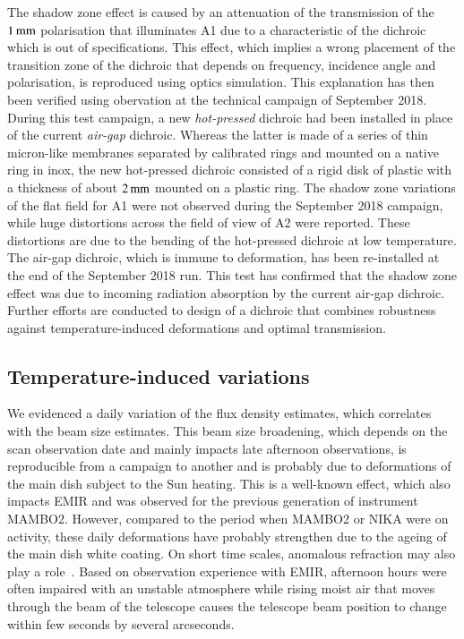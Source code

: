 The shadow zone effect is caused by an attenuation of
the transmission of the $1\,\rm{mm}$ polarisation that illuminates
A1 due to a characteristic of the dichroic which is out of
specifications.
This effect,
which implies a wrong placement of the transition zone of the dichroic
that depends on frequency, incidence angle and polarisation, is 
reproduced using optics simulation. This explanation has then been
verified using obervation at the technical campaign of September
2018. During this test campaign, a new \emph{hot-pressed} dichroic had
been installed in place of the current \emph{air-gap} dichroic.
Whereas the latter is made of a series of thin
micron-like membranes separated by calibrated rings and mounted on
a native ring in inox, the new hot-pressed dichroic consisted of a
rigid disk of plastic with a thickness of about $2\,\rm{mm}$ mounted on a
plastic ring. The shadow zone variations of the flat field for A1 were
not observed during the September 2018 campaign, while huge distortions
across the field of view of A2 were reported. These distortions are
due to the bending of the hot-pressed dichroic at low temperature.
The air-gap dichroic, which is immune to deformation, has been
re-installed at the end of the September 2018 run. This test has
confirmed that the shadow zone effect was due
to incoming radiation absorption by the current air-gap dichroic.
Further efforts are conducted to design of a dichroic that combines
robustness against temperature-induced deformations and optimal
transmission.



\subsection{Temperature-induced variations}
\label{se:beam_variation}
We evidenced a daily variation of the flux density estimates,
which correlates with the beam size estimates.
This beam size broadening, which depends on the
scan observation date and mainly impacts late
afternoon observations, is reproducible from a campaign to another and 
is probably due to deformations of the main dish subject to the Sun
heating. This is a well-known effect, which also impacts EMIR and was
observed for the previous generation of instrument MAMBO2. However,
compared to the period when MAMBO2 or NIKA were on activity, these
daily deformations have probably strengthen due to the ageing of the
main dish white coating. On short time scales, anomalous refraction
may also play a role~\citep{Altenhoff1987}. Based on observation
experience with EMIR, afternoon hours were often impaired with an
unstable atmosphere while rising moist air that
moves through the beam of the telescope causes the telescope beam
position to change within few seconds by several arcseconds.

